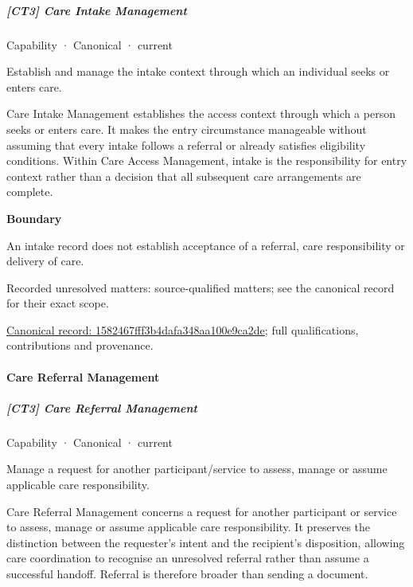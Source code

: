 \subparagraph{[CT3] Care Intake Management}

\label{element:1582467fff3b4dafa348aa100e9ca2de}
{\small Capability · Canonical · current}\par

Establish and manage the intake context through which an individual seeks or enters care.



Care Intake Management establishes the access context through which a person seeks or enters care. It makes the entry circumstance manageable without assuming that every intake follows a referral or already satisfies eligibility conditions. Within Care Access Management, intake is the responsibility for entry context rather than a decision that all subsequent care arrangements are complete.



\textbf{Boundary}



An intake record does not establish acceptance of a referral, care responsibility or delivery of care.


{\small Recorded unresolved matters: source-qualified matters; see the canonical record for their exact scope.}\par
{\footnotesize \href{../../../../continuum/strategy/capability/1582467fff3b4dafa348aa100e9ca2de.md}{Canonical record: 1582467fff3b4dafa348aa100e9ca2de}; full qualifications, contributions and provenance.}\par
\paragraph{Care Referral Management}

\subparagraph{[CT3] Care Referral Management}

\label{element:ebdaa781bba542f8b744ef34a836a269}
{\small Capability · Canonical · current}\par

Manage a request for another participant/service to assess, manage or assume applicable care responsibility.



Care Referral Management concerns a request for another participant or service to assess, manage or assume applicable care responsibility. It preserves the distinction between the requester's intent and the recipient's disposition, allowing care coordination to recognise an unresolved referral rather than assume a successful handoff. Referral is therefore broader than sending a document.



